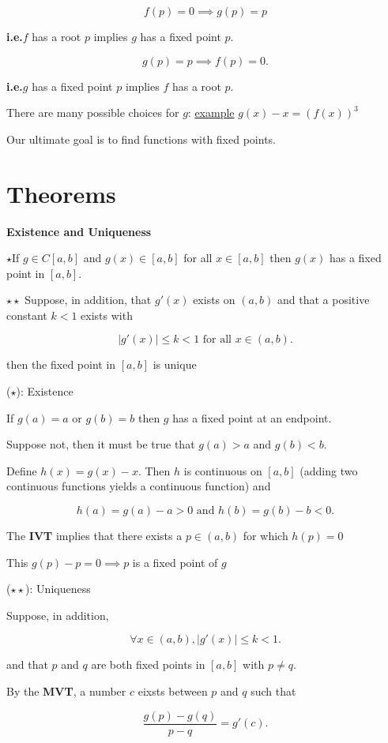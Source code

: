 \documentclass[12pt]{article}
\newcommand{\ie}{\textbf{i.e.}\xspace}
\begin{document}
\[ f(p) = 0 \implies g(p) = p \]

\ie $f$ has a root $p$ implies $g$ has a fixed point $p$.

\[
g(p) = p \implies f(p) = 0
.\]

\ie $g$ has a fixed point $p$ implies $f$ has a root $p$.


There are many possible choices for $g$: 
\uline{example} $g(x) -x = \left( f(x) \right)^3$

Our ultimate goal is to find functions with fixed points.

\section{Theorems}

\textbf{Existence and Uniqueness}

$\star$If $g\in C[a,b]$ and $g(x) \in [a, b]$ for all $x\in [a, b]$ then $g(x)$ has a
fixed point in $[a, b]$.

$\star\star$ Suppose, in addition, that $g'(x)$ exists on $(a, b)$ and that a
positive constant $k<1$ exists with 

\[
|g'(x)| \leq k < 1 \text{ for all } x \in (a, b)
.\]

then the fixed point in $[a, b]$ is unique

\proof($\star$): Existence

If $g(a) = a$ or $g(b) = b$ then $g$ has a fixed point at an 
endpoint.

Suppose not, then it must be true that $g(a) > a$ and $g(b) < b$.

Define $h(x) = g(x) - x$. Then $h$ is continuous on $[a, b]$ (adding two
continuous functions yields a continuous function) and

\[
h(a) = g(a) -a > 0 \text{ and } h(b) = g(b) - b < 0
.\]

The \textbf{IVT} implies that there exists a $p \in (a, b)$ for which $h(p) = 0$

This $g(p) - p = 0 \implies p$ is a fixed point of $g$

\proof($\star\star$): Uniqueness

Suppose, in addition,

\[
\forall x \in (a,b), |g'(x)| \leq k < 1
.\]

and that $p$ and $q$ are both fixed points in $[a, b]$ with $p \ne q$.

By the \textbf{MVT}, a number $c$ eixsts between $p$ and $q$ such that

\[
\frac{g(p) - g(q)}{p-q} = g'(c)
.\]
\end{document}

